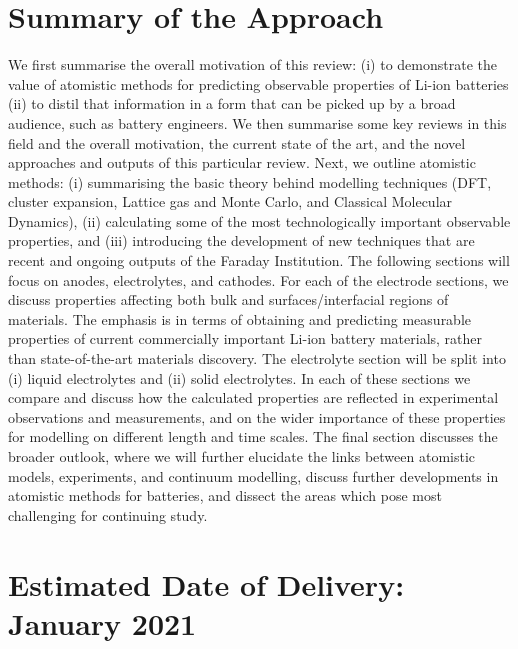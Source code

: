 \documentclass{article}
\begin{document}
\section*{Summary of the Approach}
We first summarise the overall motivation of this review: (i) to demonstrate the value of atomistic methods for predicting observable properties of Li-ion batteries (ii) to distil that information in a form that can be picked up by a broad audience, such as battery engineers. We then summarise some key reviews in this field and the overall motivation, the current state of the art, and the novel approaches and outputs of this particular review. Next, we outline atomistic methods: (i) summarising the basic theory behind modelling techniques (DFT, cluster expansion, Lattice gas and Monte Carlo, and Classical Molecular Dynamics), (ii) calculating some of the most technologically important observable properties, and (iii) introducing the development of new techniques that are recent and ongoing outputs of the Faraday Institution. The following sections will focus on anodes, electrolytes, and cathodes. For each of the electrode sections, we discuss properties affecting both bulk and surfaces/interfacial regions of materials. The emphasis is in terms of obtaining and predicting measurable properties of current commercially important Li-ion battery materials, rather than state-of-the-art materials discovery. The electrolyte section will be split into (i) liquid electrolytes and (ii) solid electrolytes. In each of these sections we compare and discuss how the calculated properties are reflected in experimental observations and measurements, and on the wider importance of these properties for modelling on different length and time scales. The final section discusses the broader outlook, where we will further elucidate the links between atomistic models, experiments, and continuum modelling, discuss further developments in atomistic methods for batteries, and dissect the areas which pose most challenging for continuing study.

\section*{Estimated Date of Delivery: January 2021} 
\end{document}
